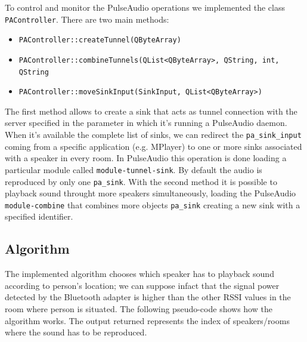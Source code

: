 \documentclass[conference]{IEEEtran}
\begin{document}
To control and monitor the PulseAudio operations we implemented the class \texttt{PAController}. There are two main methods:
\begin{itemize}
\item \texttt{PAController::createTunnel(QByteArray)}
\item \texttt{PAController::combineTunnels(QList<QByteArray>, QString, int, QString}
\item \texttt{PAController::moveSinkInput(SinkInput, QList<QByteArray>)}
\end{itemize}
The first method allows to create a sink that acts as tunnel connection with the server specified in the parameter in which it's running a PulseAudio daemon. When it's available the complete list of sinks, we can redirect the \texttt{pa\_sink\_input} coming from a specific application (e.g. MPlayer) to one or more sinks associated with a speaker in every room. In PulseAudio this operation is done loading a particular module called \texttt{module-tunnel-sink}.
By default the audio is reproduced by only one \texttt{pa\_sink}. With the second method it is possible to playback sound throught more speakers simultaneously, loading the PulseAudio \texttt{module-combine} that combines more objects \texttt{pa\_sink} creating a new sink with a specified identifier.


\subsection{Algorithm}
The implemented algorithm chooses which speaker has to playback sound according to person's location; we can suppose infact that the signal power detected by the Bluetooth adapter is higher than the other RSSI values in the room where person is situated. The following pseudo-code shows how the algorithm works. The output returned represents the index of speakers/rooms where the sound has to be reproduced.
\end{document}
